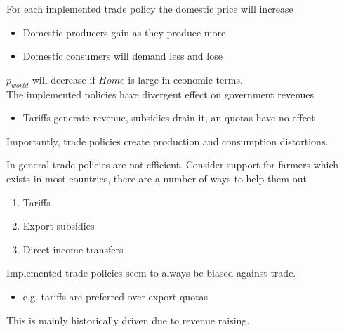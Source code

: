\documentclass{beamer}
\begin{document}
\begin{frame}
  For each implemented trade policy the domestic price will increase
  \begin{itemize}
    \item Domestic producers gain as they produce more
    \item Domestic consumers will demand less and lose
  \end{itemize}
  \medskip
  $p_{world}$ will decrease if $Home$ is large in economic terms.\\
  The implemented policies have divergent effect on government revenues
  \begin{itemize}
    \item Tariffs generate revenue, subsidies drain it, an quotas have no effect    
  \end{itemize}
  \medskip
  Importantly, trade policies create production and consumption distortions.
\end{frame}

\begin{frame}
  \begin{table}
  \end{table}
\end{frame}

\begin{frame}
 In general trade policies are not efficient. 
 Consider support for farmers which exists in most countries, there are a number of ways to help them out
 \begin{enumerate}
   \item Tariffs
   \item Export subsidies
   \item Direct income transfers
 \end{enumerate}
 \medskip
 Implemented trade policies seem to always be biased against trade.
 \begin{itemize}
   \item e.g. tariffs are preferred over export quotas
 \end{itemize}
 \medskip
 This is mainly historically driven due to revenue raising. 
\end{frame}
\end{document}
